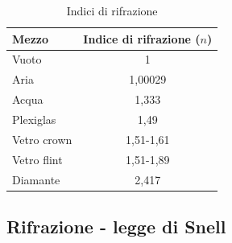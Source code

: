 \begin{table}
\centering
\begin{tabular}{l|c}

Mezzo & Indice di rifrazione ($n$) \\
\hline
Vuoto &1\\
Aria  &1,00029\\
Acqua &1,333\\
Plexiglas &1,49\\
Vetro crown &1,51-1,61\\
Vetro flint &1,51-1,89\\
Diamante &2,417\\
\end{tabular}

\caption{Indici di rifrazione}
\label{table:indici-rifrazione}

\end{table}

\subsection{Rifrazione - legge di Snell}



